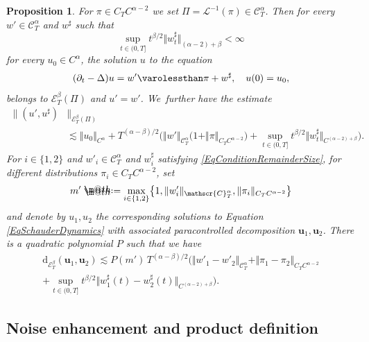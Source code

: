 \documentclass[10pt]{amsart}
\makeatletter
\newtheorem{prop}[thm]{Proposition}
\theoremstyle{definition}
\newcommand{\mcE}{\mathcal{E}}
\newcommand{\bsu}{\boldsymbol{u}}
\newcommand{\scrC}{\ensuremath{\mathscr{C}}}
\newcommand*{\defeq}{\mathrel{\rlap{%
\raisebox{0.3ex}{$\m@th\cdot$}}%
\raisebox{-0.3ex}{$\m@th\cdot$}}%
=}
\newcommand{\norme}[1]{\Vert #1 \Vert}
\newcommand{\scrL}{\mathscr{L}}
\makeatother
\begin{document}
\begin{prop} \label{schauder3}
For $\pi\in C_TC^{\alpha-2}$ we set $\Pi=\scrL^{-1}(\pi)\in\scrC^\alpha_T$. Then for every $w'\in\scrC^\alpha_T$ and $w^\sharp$ such that
\begin{equation} \label{EqConditionRemainderSize}
\sup_{t\in(0,T]} t^{\beta/2}\big\Vert w_t^\sharp\big\Vert_{(\alpha-2)+\beta} < \infty
\end{equation}
for every $u_0\in C^\alpha$, the solution $u$ to the equation
\begin{equation} \label{EqSchauderDynamics}
(\partial_t-\Delta)u = w' \varolessthan \pi + w^\sharp, \quad u(0)=u_0,
\end{equation}
belongs to $\mcE^\beta_T(\Pi)$ and $u'=w'$. We~further have the estimate
\begin{equation*} \begin{split}
\big\| (u',u^\sharp) &\big\|_{\mcE^\beta_T(\Pi)} \\
&\lesssim \norme{u_0}_{C^\alpha} + T^{(\alpha-\beta)/2}\bigl( \norme{w'}_{\scrC^\alpha_T}\bigl(1+\norme{\pi}_{C_TC^{\alpha-2}}\bigr) + \sup_{t\in(0,T]} t^{\beta/2}\big\Vert w^\sharp_t\big\Vert_{C^{(\alpha-2)+\beta}} \bigr).
\end{split} \end{equation*}
For $i\in\{1,2\}$ and $w'_i \in \scrC^\alpha_T$ and $w^\sharp_i$ satisfying \eqref{EqConditionRemainderSize}, for different distributions $\pi_i\in C_TC^{\alpha-2}$, set
\[
m' \defeq \max_{i\in\{1,2\}} \bigl\{1,\Vert w'_{i}\Vert_{\scrC^\alpha_T}, \norme{\pi_i}_{C_TC^{\alpha-2}}\bigr\}
\]
and denote by $u_1,u_2$ the corresponding solutions to Equation \eqref{EqSchauderDynamics} with associated paracontrolled decomposition $\bsu_1, \bsu_2$. There is a quadratic polynomial $P$ such that we have
\begin{multline*}
\text{d}_{\mcE^\beta_T}(\bsu_1, \bsu_2) \lesssim P(m') \, T^{(\alpha-\beta)/2}\bigl(\norme{w'_1 - w'_2}_{\scrC^\alpha_T} + \Vert \pi_1-\pi_2\Vert_{C_TC^{\alpha-2}} \\
+ \sup_{t\in (0,T]}t^{\beta/2}\big\Vert w_1^\sharp(t) - w_2^\sharp(t)\big\Vert_{C^{(\alpha-2)+\beta}} \bigr).
\end{multline*}
\end{prop}

\subsection{Noise enhancement and product definition}
\label{SectionNoiseEnhancement}
\end{document}
